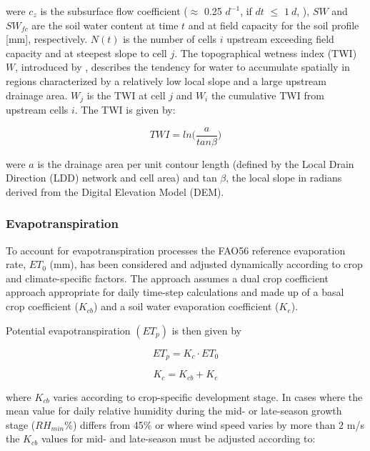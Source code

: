 \documentclass[]{article}
\begin{document}
were \(c_z\) is the subsurface flow coefficient (\(\approx\) 0.25
\(d^{-1}\), if \(dt\) \(\leq\) \(1~d\), \citep{Manfreda2005}), \(SW\)
and \(SW_{fc}\) are the soil water content at time \(t\) and at field
capacity for the soil profile {[}mm{]}, respectively. \(N(t)\) is the
number of cells \(i\) upstream exceeding field capacity and at steepest
slope to cell \(j\). The topographical wetness index (TWI) \(W\),
introduced by \cite{Beven1979}, describes the tendency for water to
accumulate spatially in regions characterized by a relatively low local
slope and a large upstream drainage area. \(W_j\) is the TWI at cell
\(j\) and \(W_i\) the cumulative TWI from upstream cells \(i\). The TWI
is given by:

\begin{equation}
TWI =ln\Big(\frac{a}{tan \beta} \Big)
\label{eq:Wz}  
\end{equation}

were \(a\) is the drainage area per unit contour length (defined by the
Local Drain Direction (LDD) network and cell area) and tan \(\beta\),
the local slope in radians derived from the Digital Elevation Model
(DEM).

\hypertarget{evapotranspiration}{%
\subsubsection{Evapotranspiration}\label{evapotranspiration}}

To account for evapotranspiration processes the FAO56 reference
evaporation rate, \(ET_0\) (mm), has been considered and adjusted
dynamically according to crop and climate-specific factors. The approach
assumes a dual crop coefficient approach appropriate for daily time-step
calculations \citep{Allen1998} and made up of a basal crop coefficient
(\(K_{cb}\)) and a soil water evaporation coefficient (\(K_e\)).

Potential evapotranspiration \((ET_p)\) is then given by

\begin{equation}
ET_p=K_c \cdot ET_0
\label{eq:ETp}  
\end{equation}

\begin{equation}
K_c = K_{cb} + K_e
\label{eq:Kc}  
\end{equation}

where \(K_{cb}\) varies according to crop-specific development stage. In
cases where the mean value for daily relative humidity during the mid-
or late-season growth stage (\(RH_{min}\)\%) differs from 45\% or where
wind speed varies by more than 2 m/s the \(K_{cb}\) values for mid- and
late-season must be adjusted according to:
\end{document}
